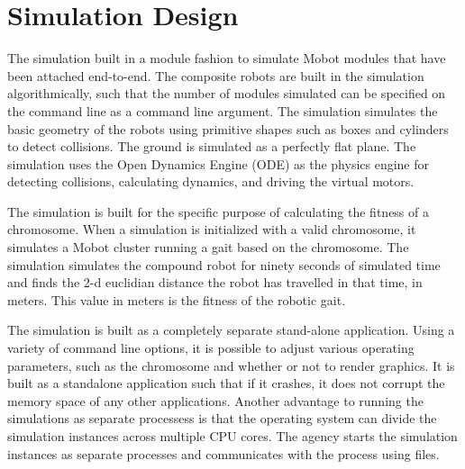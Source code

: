 \section{Simulation Design}
  The simulation built in a module fashion to simulate Mobot modules that
    have been attached end-to-end. 
  The composite robots are built in the simulation algorithmically, such that 
    the number of modules simulated can be specified on the command line
    as a command line argument.
  The simulation simulates the basic geometry of the robots using primitive 
    shapes such as boxes and cylinders to detect collisions.
  The ground is simulated as a perfectly flat plane.
  The simulation uses the Open Dynamics Engine (ODE)\cite{ode} as the physics
    engine for detecting collisions, calculating dynamics, and driving the 
    virtual motors.

  The simulation is built for the specific purpose of calculating the fitness
    of a chromosome.
  When a simulation is initialized with a valid chromosome, it simulates a 
    Mobot cluster running a gait based on the chromosome. 
  The simulation simulates the compound robot for ninety seconds of simulated
    time and finds the 2-d euclidian distance the robot has travelled in that
    time, in meters.
  This value in meters is the fitness of the robotic gait. 

  The simulation is built as a completely separate stand-alone application. 
  Using a variety of command line options, it is possible to adjust various
    operating parameters, such as the chromosome and whether or not to render
    graphics.
  It is built as a standalone application such that if it crashes, it does not
    corrupt the memory space of any other applications.
  Another advantage to running the simulations as separate processess is that
    the operating system can divide the simulation instances across multiple
    CPU cores. 
  The agency starts the simulation instances as separate processes and communicates
    with the process using files.

